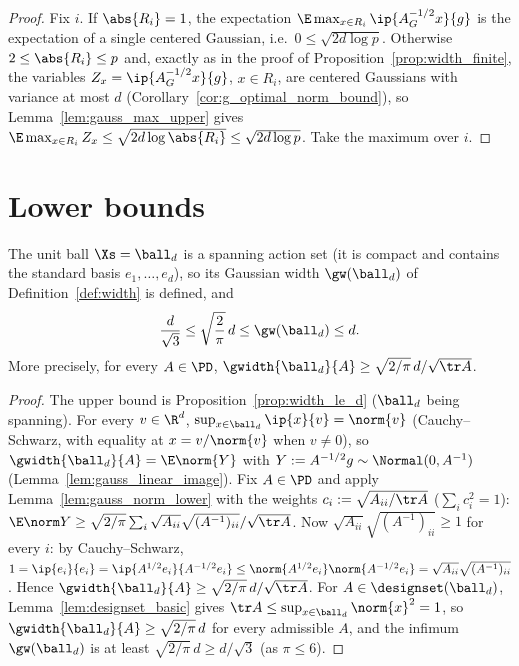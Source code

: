 \begin{proof}
\leanok
{}
Fix $i$. If $\abs{R_i} = 1$, the expectation $\E\max_{x\in R_i}\ip{A_G^{-1/2}x}{g}$ is the
expectation of a single centered Gaussian, i.e.\ $0 \le \sqrt{2d\log p}$. Otherwise
$2 \le \abs{R_i} \le p$ and, exactly as in the proof of Proposition~\ref{prop:width_finite},
the variables $Z_x = \ip{A_G^{-1/2}x}{g}$, $x \in R_i$, are centered Gaussians with variance
at most $d$ (Corollary~\ref{cor:g_optimal_norm_bound}), so Lemma~\ref{lem:gauss_max_upper}
gives $\E\max_{x\in R_i}Z_x \le \sqrt{2d\log\abs{R_i}} \le \sqrt{2d\log p}$. Take the
maximum over $i$.
\end{proof}

\section{Lower bounds}
\label{sec:width_lower}

\begin{proposition}\label{prop:width_ball}
\leanok
{}
The unit ball $\Xs = \ball_d$ is a spanning action set (it is compact and contains the
standard basis $e_1,\dots,e_d$), so its Gaussian width $\gw(\ball_d)$ of
Definition~\ref{def:width} is defined, and
\[
  \frac{d}{\sqrt 3} \le \sqrt{\frac{2}{\pi}}\,d \le \gw(\ball_d) \le d .
\]
More precisely, for every $A \in \PD$, $\gwidth{\ball_d}{A} \ge \sqrt{2/\pi}\,d/\sqrt{\tr A}$.
\end{proposition}

\begin{proof}
\leanok
{}
The upper bound is Proposition~\ref{prop:width_le_d} ($\ball_d$ being spanning). For every
$v \in \R^d$, $\sup_{x\in\ball_d}\ip{x}{v} = \norm{v}$ (Cauchy--Schwarz, with equality at
$x = v/\norm{v}$ when $v \ne 0$), so $\gwidth{\ball_d}{A} = \E\norm{Y}$ with
$Y := A^{-1/2}g \sim \Normal(0, A^{-1})$ (Lemma~\ref{lem:gauss_linear_image}). Fix $A \in \PD$
and apply Lemma~\ref{lem:gauss_norm_lower} with the weights $c_i := \sqrt{A_{ii}/\tr A}$
($\sum_i c_i^2 = 1$):
$\E\norm Y \ge \sqrt{2/\pi}\sum_i \sqrt{A_{ii}}\sqrt{(A^{-1})_{ii}}/\sqrt{\tr A}$. Now
$\sqrt{A_{ii}}\sqrt{(A^{-1})_{ii}} \ge 1$ for every $i$: by Cauchy--Schwarz,
$1 = \ip{e_i}{e_i} = \ip{A^{1/2}e_i}{A^{-1/2}e_i} \le \norm{A^{1/2}e_i}\norm{A^{-1/2}e_i}
= \sqrt{A_{ii}}\sqrt{(A^{-1})_{ii}}$. Hence
$\gwidth{\ball_d}{A} \ge \sqrt{2/\pi}\,d/\sqrt{\tr A}$. For $A \in \designset(\ball_d)$,
Lemma~\ref{lem:designset_basic} gives $\tr A \le \sup_{x\in\ball_d}\norm{x}^2 = 1$, so
$\gwidth{\ball_d}{A} \ge \sqrt{2/\pi}\,d$ for every admissible $A$, and the infimum
$\gw(\ball_d)$ is at least $\sqrt{2/\pi}\,d \ge d/\sqrt 3$ (as $\pi \le 6$).
\end{proof}

